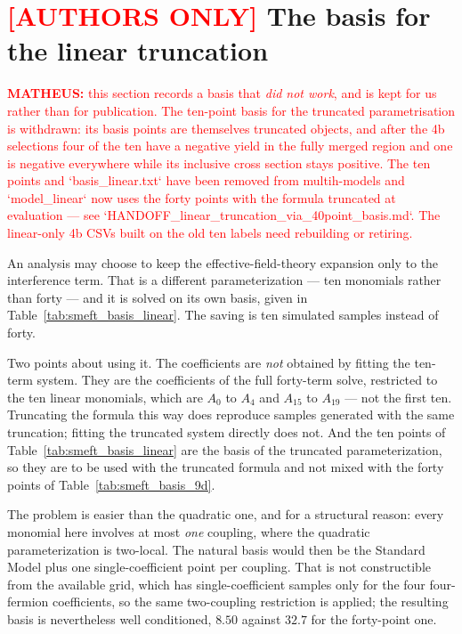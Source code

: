 \section{\textcolor{red}{[AUTHORS ONLY]} The basis for the linear truncation}
\label{sec:appendix_linear}
\label{sec:basis_linear}

\textcolor{red}{\textbf{MATHEUS:} this section records a basis that \emph{did not
work}, and is kept for us rather than for publication. The ten-point basis for the
truncated parametrisation is withdrawn: its basis points are themselves truncated
objects, and after the 4b selections four of the ten have a negative yield in the fully
merged region and one is negative everywhere while its inclusive cross section stays
positive. The ten points and `basis\_linear.txt` have been removed from multih-models
and `model\_linear` now uses the forty points with the formula truncated at evaluation
--- see `HANDOFF\_linear\_truncation\_via\_40point\_basis.md`. The linear-only 4b CSVs
built on the old ten labels need rebuilding or retiring.}

An analysis may choose to keep the effective-field-theory expansion only to the
interference term. That is a different parameterization --- ten monomials
rather than forty --- and it is solved on its own basis, given in
Table~\ref{tab:smeft_basis_linear}. The saving is ten simulated samples instead of forty.

Two points about using it. The coefficients are
\emph{not} obtained by fitting the ten-term system. They are the coefficients of
the full forty-term solve, restricted to the ten linear monomials, which are
$A_0$ to $A_4$ and $A_{15}$ to $A_{19}$ --- not the first ten. Truncating the
formula this way does reproduce samples generated with the same truncation;
fitting the truncated system directly does not. And the ten points of
Table~\ref{tab:smeft_basis_linear} are the basis of the truncated
parameterization, so they are to be used with the truncated formula and not
mixed with the forty points of Table~\ref{tab:smeft_basis_9d}.

The problem is easier than the quadratic one, and for a structural reason: every
monomial here involves at most \emph{one} coupling, where the quadratic
parameterization is two-local. The natural basis would then be the Standard
Model plus one single-coefficient point per coupling. That is not constructible
from the available grid, which has single-coefficient samples only for the four
four-fermion coefficients, so the same two-coupling restriction is applied; the
resulting basis is nevertheless well conditioned, $8.50$ against $32.7$ for the
forty-point one.


